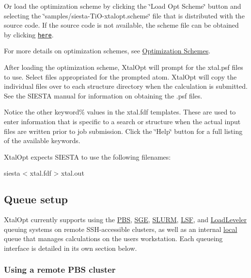 Or load the optimization scheme by clicking the \char`\"{}\+Load Opt Scheme\char`\"{} button and selecting the \char`\"{}samples/siesta-\/\+Ti\+O-\/xtalopt.\+scheme\char`\"{} file that is distributed with the source code. If the source code is not available, the scheme file can be obtained by clicking \href{http://xtalopt.github.io/samples/siesta-TiO-xtalopt.scheme}{\tt here}.

For more details on optimization schemes, see \hyperlink{optschemes}{Optimization Schemes}.

After loading the optimization scheme, Xtal\+Opt will prompt for the xtal.\+psf files to use. Select files appropriated for the prompted atom. Xtal\+Opt will copy the individual files over to each structure directory when the calculation is submitted. See the S\+I\+E\+S\+T\+A manual for information on obtaining the .psf files.

Notice the other keyword\% values in the xtal.\+fdf templates. These are used to enter information that is specific to a search or structure when the actual input files are written prior to job submission. Click the \char`\"{}\+Help\char`\"{} button for a full listing of the available keywords.

Xtal\+Opt expects S\+I\+E\+S\+T\+A to use the following filenames\+:


\begin{DoxyPre}siesta < xtal.fdf > xtal.out\end{DoxyPre}
\hypertarget{tut-xo_qisetup}{}\subsection{Queue setup}\label{tut-xo_qisetup}
Xtal\+Opt currently supports using the \hyperlink{tut-xo_remotepbs}{P\+B\+S}, \hyperlink{tut-xo_remotesge}{S\+G\+E}, \hyperlink{tut-xo_remoteslurm}{S\+L\+U\+R\+M}, \hyperlink{tut-xo_remotelsf}{L\+S\+F}, and \hyperlink{tut-xo_remotell}{Load\+Leveler} queuing systems on remote S\+S\+H-\/accessible clusters, as well as an internal \hyperlink{tut-xo_localqi}{local} queue that manages calculations on the user\textquotesingle{}s workstation. Each queueing interface is detailed in its own section below.\hypertarget{tut-xo_remotepbs}{}\subsubsection{Using a remote P\+B\+S cluster}\label{tut-xo_remotepbs}
 
